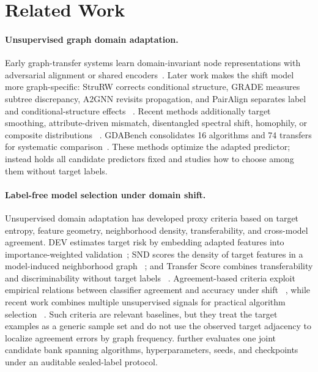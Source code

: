 \section{Related Work}
\label{sec:related_work}

\paragraph{Unsupervised graph domain adaptation.}
Early graph-transfer systems learn domain-invariant node representations with
adversarial alignment or shared encoders~\citep{zhang2019dane,wu2020unsupervised,dai2022graph}.
Later work makes the shift model more graph-specific: StruRW corrects
conditional structure, GRADE measures subtree discrepancy, A2GNN revisits
propagation, and PairAlign separates label and conditional-structure effects
~\citep{liu2023structural,wu2023non,liu2024rethinking,liu2024pairwisealignmentimprovesgraph}.
Recent methods additionally target smoothing, attribute-driven mismatch,
disentangled spectral shift, homophily, or composite distributions
~\citep{chen2025smoothness,fang2025attribute,yang2025disentangled,
pmlr-v267-fang25g,chen2026learningadaptivedistributionalignment}.
GDABench consolidates 16 algorithms and 74 transfers for systematic
comparison~\citep{liu2024revisitingbenchmarkingunderstandingunsupervised}.
These methods optimize the adapted predictor; \method instead holds all
candidate predictors fixed and studies how to choose among them without target
labels.

\paragraph{Label-free model selection under domain shift.}
Unsupervised domain adaptation has developed proxy criteria based on target
entropy, feature geometry, neighborhood density, transferability, and
cross-model agreement. DEV estimates target risk by embedding adapted features
into importance-weighted validation~\citep{you2019dev}; SND scores the density
of target features in a model-induced neighborhood graph
~\citep{saito2021tunerightwayunsupervised}; and Transfer Score combines
transferability and discriminability without target labels
~\citep{yang2023transferscore}. Agreement-based criteria exploit empirical
relations between classifier agreement and accuracy under shift
~\citep{jiang2021disagreement,baek2022agreement}, while recent work combines
multiple unsupervised signals for practical algorithm selection
~\citep{xiong2026practicalalgorithmselectionunsupervised}.
Such criteria are relevant baselines, but they treat the target examples as a
generic sample set and do not use the observed target adjacency to localize
agreement errors by graph frequency. \benchmark further evaluates one joint
candidate bank spanning algorithms, hyperparameters, seeds, and checkpoints
under an auditable sealed-label protocol.

